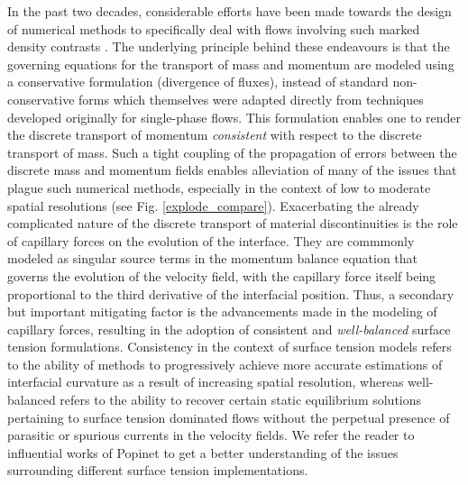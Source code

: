 In the past two decades, considerable efforts have been made 
towards the design of numerical methods to specifically deal with 
flows involving such marked density contrasts
. 
The underlying principle behind these endeavours is that the governing 
equations for the transport of mass and momentum are modeled using a 
conservative formulation (divergence of fluxes), instead of standard 
non-conservative forms which themselves were adapted directly from 
techniques developed originally for single-phase flows. 
This formulation enables one to render the discrete transport of 
momentum \textit{consistent} with respect to the discrete transport of mass.  
Such a tight coupling of the propagation of errors between the discrete 
mass and momentum fields enables alleviation of many of the issues 
that plague such numerical methods, especially in the 
context of low to moderate spatial resolutions (see Fig. \ref{explode_compare}). 
Exacerbating the already complicated nature of the discrete transport of material 
discontinuities is the role of capillary forces on the evolution of the interface. 
They are commmonly modeled as singular source terms in the momentum balance equation that 
governs the evolution of the velocity field, with the capillary force itself 
being proportional to the third derivative of the interfacial position. 
Thus, a secondary but important mitigating factor is the advancements 
made in the modeling of capillary forces, resulting in the adoption of 
consistent and \textit{well-balanced} surface tension formulations.
Consistency in the context of surface tension models refers to the ability 
of methods to progressively achieve more accurate estimations of interfacial 
curvature as a result of increasing spatial resolution, 
whereas well-balanced refers to the ability to recover certain static 
equilibrium solutions pertaining to surface tension dominated flows 
without the perpetual presence of parasitic or spurious currents in the velocity fields.
We refer the reader to influential works of Popinet \cite{popinet2018numerical,popinet2009accurate}
to get a better understanding of the issues surrounding different surface tension implementations.  



